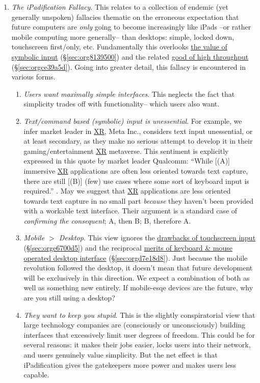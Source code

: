 \documentclass[logo,bsc,singlespacing,parskip]{infthesis}
\begin{document}
\begin{enumerate}
\item \emph{The iPadification Fallacy}.\label{ipadification fallacy}
This relates to a collection of endemic (yet generally unspoken) fallacies thematic on the erroneous expectation that future computers are \emph{only} going to become increasingly like iPads --or rather mobile computing more generally-- than desktops: simple, locked down, touchscreen first/only, etc.
Fundamentally this overlooks \hyperref[sec:org8139500]{the value of symbolic input} (\S \ref{sec:org8139500}) and the related \hyperref[sec:orgce39a5d]{good of high throughput} (\S \ref{sec:orgce39a5d}).
Going into greater detail, this fallacy is encountered in various forms.
\begin{enumerate}
\item \emph{Users want maximally simple interfaces}.
This neglects the fact that simplicity trades off with functionality-- which users also want.
\item \emph{Text/command based (symbolic) input is unessential}.
For example, we infer market leader in \hyperref[orgf7f8e78]{XR},  Meta Inc., considers text input unessential, or at least secondary, as they make no serious attempt to develop it in their gaming/entertainment \hyperref[orgf7f8e78]{XR} metaverse.
This sentiment is explicitly expressed in this quote by market leader Qualcomm: ``While [(A)] immersive \hyperref[orgf7f8e78]{XR} applications are often less oriented towards text capture, there are still [(B)] (few) use cases where some sort of keyboard input is required.'' \autocite{qualcommXRUserInterfaces}.
May we suggest that \hyperref[orgf7f8e78]{XR} applications are less oriented towards text capture in no small part \emph{because} they haven't been provided with a workable text interface.
Their argument is a standard case of \emph{confirming the consequent}; A, then B; B, therefore A.
\item \emph{Mobile \(>\) Desktop}.
This view ignores the \hyperref[sec:orge6700d5]{drawbacks of touchscreen input} (\S \ref{sec:orge6700d5}) and the reciprocal \hyperref[sec:orgd7e18d8]{merits of keyboard \& mouse operated desktop interface} (\S \ref{sec:orgd7e18d8}).
Just because the mobile revolution followed the desktop, it doesn't mean that future development will be exclusively in this direction.
We expect a combination of both as well as something new entirely.
If mobile-esqe devices are the future, why are you still using a desktop?
\item \emph{They want to keep you stupid}.
This is the slightly conspiratorial view that large technology companies are (consciously or unconsciously) building interfaces that excessively limit user degrees of freedom.
This could be for several reasons: it makes their jobs easier, locks users into their network, and users genuinely value simplicity.
But the net effect is that iPadification gives the gatekeepers more power and makes users less capable.
\end{enumerate}


\end{enumerate}
\end{document}
